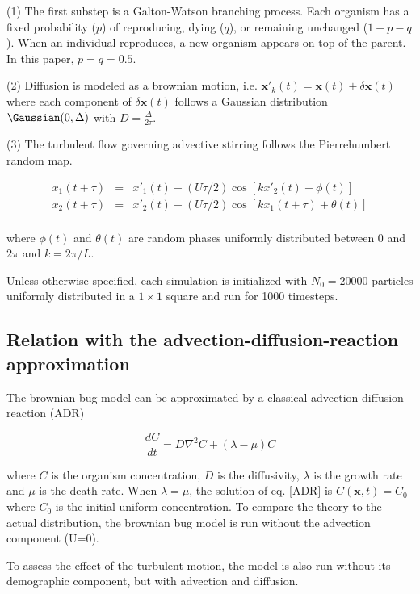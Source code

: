 (1) The first substep is a Galton-Watson branching process. Each organism has a fixed probability ($p$) of reproducing, dying ($q$), or remaining unchanged ($1-p-q$). When an individual reproduces, a new organism appears on top of the parent. In this paper, $p=q=0.5$.

(2) Diffusion is modeled as a brownian motion, i.e. $\mathbf{x'}_k(t)=\mathbf{x}(t)+\delta\mathbf{x}(t)$ where each component of $\delta\mathbf{x}(t)$ follows a Gaussian distribution $\Gaussian (0,\Delta)$ with $D=\frac{\Delta}{2\tau}$. 

(3) The turbulent flow governing advective stirring follows the Pierrehumbert random map.

\begin{eqnarray}
 x_1(t+\tau)&=&x'_1(t)+(U\tau/2)\cos[kx'_2(t)+\phi(t)]\\
 x_2(t+\tau)&=&x'_2(t)+(U\tau/2)\cos[kx_1(t+\tau)+\theta(t)]\\
 \label{eq:pierrehumbert}
 \end{eqnarray}

 where $\phi(t)$ and $\theta(t)$ are random phases uniformly distributed between 0 and $2\pi$ and $k=2\pi/L$.
 
Unless otherwise specified, each simulation is initialized with $N_0=20 000$ particles uniformly distributed in a $1\times 1$ square and run for 1000 timesteps.
 
\subsection*{Relation with the advection-diffusion-reaction approximation} 
The brownian bug model can be approximated by a classical advection-diffusion-reaction (ADR)

\begin{equation}
\frac{dC}{dt}=D\nabla^2 C+(\lambda-\mu)C
\label{eq:ADR}
\end{equation}

where $C$ is the organism concentration, $D$ is the diffusivity, $\lambda$ is the growth rate and $\mu$ is the death rate. When $\lambda=\mu$, the solution of eq. \ref{ADR} is $C(\mathbf{x},t)=C_0$ where $C_0$ is the initial uniform concentration. To compare the theory to the actual distribution, the brownian bug model is run without the advection component (U=0).

To assess the effect of the turbulent motion, the model is also run without its demographic component, but with advection and diffusion.

